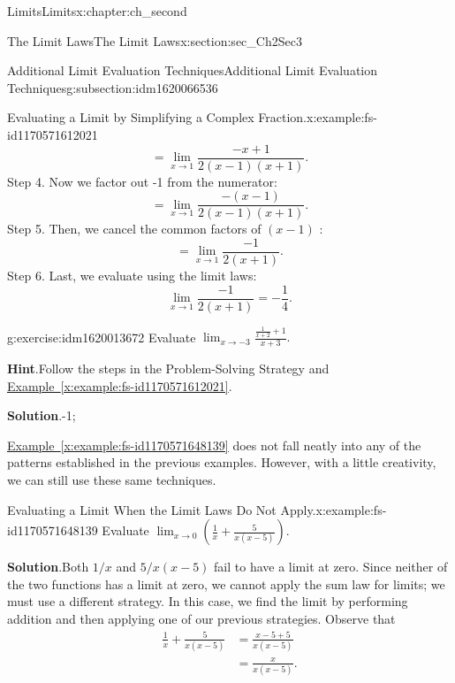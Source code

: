 \documentclass[oneside,10pt,]{book}
\newcommand{\blocktitlefont}{\relax}
\newcommand{\xreffont}{\relax}
\numberwithin{equation}{section}
\newcommand{\amp}{&}
\begin{document}
\begin{chapterptx}{Limits}{}{Limits}{}{}{x:chapter:ch_second}
\begin{sectionptx}{The Limit Laws}{}{The Limit Laws}{}{}{x:section:sec_Ch2Sec3}
\begin{subsectionptx}{Additional Limit Evaluation Techniques}{}{Additional Limit Evaluation Techniques}{}{}{g:subsection:idm1620066536}
\begin{example}{Evaluating a Limit by Simplifying a Complex Fraction.}{x:example:fs-id1170571612021}
%
\begin{equation*}
=\lim_{x \to 1 }\frac{-x+1}{2(x-1)(x+1)}.
\end{equation*}
Step 4. Now we factor out -1 from the numerator:%
%
\begin{equation*}
=\lim_{x \to 1 }\frac{-(x-1)}{2(x-1)(x+1)}.
\end{equation*}
Step 5. Then, we cancel the common factors of \((x-1)\text{ : }\)%
%
\begin{equation*}
=\lim_{x \to 1 }\frac{-1}{2(x+1)}.
\end{equation*}
Step 6. Last, we evaluate using the limit laws:%
%
\begin{equation*}
\lim_{x \to 1 }\frac{-1}{2(x+1)}=-\frac{1}{4}.
\end{equation*}
\end{example}
\begin{inlineexercise}{}{g:exercise:idm1620013672}%
Evaluate \(\lim_{x \to -3 }\frac{\frac{1}{x+2}+1}{x+3}.\)%
\par\smallskip%
\noindent\textbf{\blocktitlefont Hint}.\hypertarget{g:hint:idm1620015208}{}\quad{}Follow the steps in the Problem-Solving Strategy and \hyperref[x:example:fs-id1170571612021]{Example~{\xreffont\ref{x:example:fs-id1170571612021}}}.%
\par\smallskip%
\noindent\textbf{\blocktitlefont Solution}.\hypertarget{g:solution:idm1620010472}{}\quad{}-1;%
\end{inlineexercise}%
\hyperref[x:example:fs-id1170571648139]{Example~{\xreffont\ref{x:example:fs-id1170571648139}}} does not fall neatly into any of the patterns established in the previous examples. However, with a little creativity, we can still use these same techniques.%
\begin{example}{Evaluating a Limit When the Limit Laws Do Not Apply.}{x:example:fs-id1170571648139}%
Evaluate \(\lim_{x \to 0 }(\frac{1}{x}+\frac{5}{x(x-5)}).\)%
\par\smallskip%
\noindent\textbf{\blocktitlefont Solution}.\hypertarget{g:solution:idm1620008552}{}\quad{}Both \(1/x\) and \(5/x(x-5)\) fail to have a limit at zero. Since neither of the two functions has a limit at zero, we cannot apply the sum law for limits; we must use a different strategy. In this case, we find the limit by performing addition and then applying one of our previous strategies. Observe that%
%
\begin{align*}
\frac{1}{x}+\frac{5}{x(x-5)}\amp=\frac{x-5+5}{x(x-5)}\\
\amp=\frac{x}{x(x-5)}.
\end{align*}

\end{example}
\end{subsectionptx}
\end{sectionptx}
\end{chapterptx}
\end{document}
